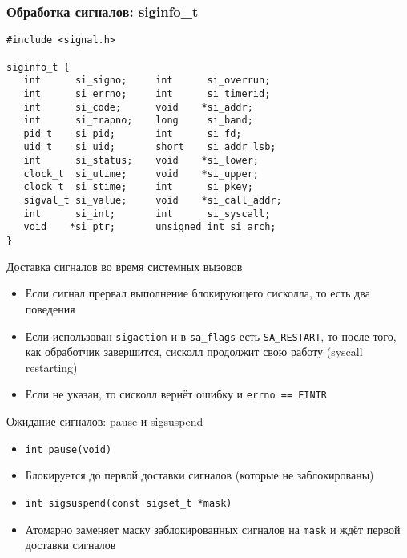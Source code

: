 \documentclass[10pt,pdf,hyperref={unicode}]{beamer}
\begin{document}
\begin{frame}[fragile]
\frametitle{Обработка сигналов: siginfo\_t}
\begin{center}
\begin{minipage}{0.95\textwidth}
\begin{verbatim}
#include <signal.h>

siginfo_t {
   int      si_signo;     int      si_overrun;
   int      si_errno;     int      si_timerid;
   int      si_code;      void    *si_addr;
   int      si_trapno;    long     si_band;
   pid_t    si_pid;       int      si_fd;
   uid_t    si_uid;       short    si_addr_lsb;
   int      si_status;    void    *si_lower;
   clock_t  si_utime;     void    *si_upper;
   clock_t  si_stime;     int      si_pkey;
   sigval_t si_value;     void    *si_call_addr;
   int      si_int;       int      si_syscall;
   void    *si_ptr;       unsigned int si_arch;
}

\end{verbatim}
\end{minipage}
\end{center}
\end{frame}

\begin{frame}{Доставка сигналов во время системных вызовов}
\begin{itemize}
    \item Если сигнал прервал выполнение блокирующего сисколла, то есть два поведения
    \item Если использован \texttt{sigaction} и в \texttt{sa_flags} есть \texttt{SA_RESTART}, то после того, как обработчик завершится, сисколл продолжит свою работу (syscall restarting)
    \item Если не указан, то сисколл вернёт ошибку и \texttt{errno == EINTR}
\end{itemize}
\end{frame}


\begin{frame}{Ожидание сигналов: pause и sigsuspend}
\begin{itemize}
    \item \texttt{int pause(void)}
    \item Блокируется до первой доставки сигналов (которые не заблокированы)
    \item \texttt{int sigsuspend(const sigset_t *mask)}
    \item Атомарно заменяет маску заблокированных сигналов на \texttt{mask} и ждёт первой доставки сигналов
\end{itemize}
\end{frame}
\end{document}
